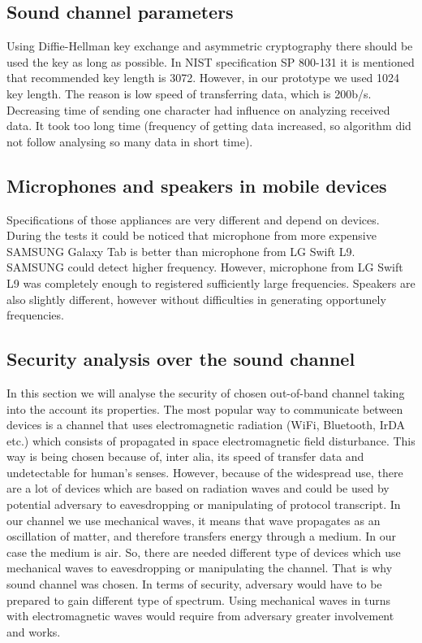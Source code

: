 \documentclass[11pt,titlepage]{article}
\theoremstyle{plain}
\begin{document}
\subsection{Sound channel parameters}

Using Diffie-Hellman key exchange and asymmetric cryptography there should be used the key as long as possible. In NIST specification SP 800-131 it is mentioned that recommended key length is 3072. However, in our prototype we used 1024 key length. The reason is low speed of transferring data, which is 200b/s. Decreasing time of sending one character had influence on analyzing received data. It took too long time (frequency of getting data increased, so algorithm did not follow analysing so many data in short time).


\subsection{Microphones and speakers in mobile devices}
Specifications of those appliances are very different and depend on devices. During the tests it could be noticed that microphone from more expensive SAMSUNG Galaxy Tab is better than microphone from LG Swift L9. SAMSUNG could detect higher frequency. However, microphone from LG Swift L9 was completely enough to registered sufficiently large frequencies. Speakers are also slightly  different, however without difficulties in  generating opportunely frequencies.

\subsection{Security analysis over the sound channel}
In this section we will analyse the security of chosen out-of-band channel taking into the account its properties. The most popular way to communicate between devices is a channel that uses electromagnetic radiation (WiFi, Bluetooth, IrDA etc.) which consists of propagated in space electromagnetic field disturbance. This way is being chosen because of, inter alia, its speed of transfer data and undetectable for human's senses. However, because of the widespread use, there are a lot of devices which are based on radiation waves and could be used by potential adversary to eavesdropping or manipulating of protocol transcript. In our channel we use mechanical waves, it means that wave propagates as an oscillation of matter, and therefore transfers energy through a medium. In our case the medium is air. So, there are needed different type of devices which use mechanical waves to eavesdropping or manipulating the channel. That is why sound channel was chosen. In terms of security, adversary would have to be prepared to gain different type of spectrum. Using mechanical waves in turns with electromagnetic waves would require from adversary greater involvement and works.
\end{document}

